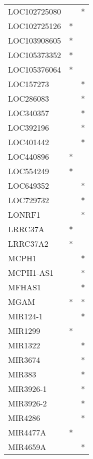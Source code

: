 \begin{longtable}{lcc}
LOC102725080 &                &          * \\
LOC102725126 &              * &            \\
LOC103908605 &              * &            \\
LOC105373352 &              * &            \\
LOC105376064 &              * &            \\
LOC157273    &                &          * \\
LOC286083    &                &          * \\
LOC340357    &                &          * \\
LOC392196    &                &          * \\
LOC401442    &                &          * \\
LOC440896    &              * &            \\
LOC554249    &              * &            \\
LOC649352    &                &          * \\
LOC729732    &                &          * \\
LONRF1       &                &          * \\
LRRC37A      &              * &            \\
LRRC37A2     &              * &            \\
MCPH1        &                &          * \\
MCPH1-AS1    &                &          * \\
MFHAS1       &                &          * \\
MGAM         &              * &          * \\
MIR124-1     &                &          * \\
MIR1299      &              * &            \\
MIR1322      &                &          * \\
MIR3674      &                &          * \\
MIR383       &                &          * \\
MIR3926-1    &                &          * \\
MIR3926-2    &                &          * \\
MIR4286      &                &          * \\
MIR4477A     &              * &            \\
MIR4659A     &                &          * \\

\end{longtable}
